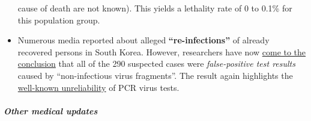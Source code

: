 \begin{itemize}
  cause of death are not known). This yields a lethality rate of 0 to
  0.1\% for this population group.
\item
  Numerous media reported about alleged \textbf{``re-infections''} of
  already recovered persons in South Korea. However, researchers have
  now
  \href{https://www.independent.co.uk/news/world/asia/coronavirus-south-korea-patients-infected-twice-test-a9491986.html}{come
  to the conclusion} that all of the 290 suspected cases were
  \emph{false-positive test results} caused by ``non-infectious virus
  fragments''. The result again highlights the
  \href{https://www.ncbi.nlm.nih.gov/pubmed/32219885}{well-known
  unreliability} of PCR virus tests.
\end{itemize}

\hypertarget{other-medical-updates}{%
\subparagraph{\texorpdfstring{\textbf{Other medical
updates}}{Other medical updates}}\label{other-medical-updates}}

